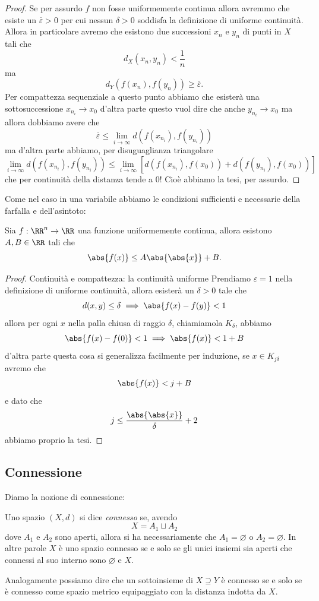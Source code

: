 \documentclass[11pt]{scrartcl}
\newcommand{\eset}{\varnothing}
\begin{document}
	\begin{proof}
		Se per assurdo $f$ non fosse uniformemente continua allora avremmo che esiste un $\overline{\varepsilon}>0$ per cui nessun $\delta>0$ soddisfa la definizione di uniforme continuità. Allora in particolare avremo che esistono due successioni $x_n$ e $y_n$ di punti in $X$ tali che
		$$d_X(x_n,y_n)<\frac{1}{n}$$
		ma
		$$d_Y\left(f(x_n),f(y_n)\right)\ge \overline{\varepsilon}.$$
		Per compattezza sequenziale a questo punto abbiamo che esisterà una sottosuccessione $x_{n_i}\to x_0$ d'altra parte questo vuol dire che anche $y_{n_i}\to x_0$ ma allora
		dobbiamo avere che
		$$\overline{\varepsilon}\le \lim_{i\to\infty}d\left(f(x_{n_i}),f(y_{n_i})\right)$$
		ma d'altra parte abbiamo, per disuguaglianza triangolare
		$$\lim_{i\to\infty}d\left(f(x_{n_i}),f(y_{n_i})\right)\le \lim_{i\to\infty}\left[d\left(f(x_{n_i}),f(x_0)\right)+d\left(f(y_{n_i}),f(x_0)\right)\right]$$
		che per continuità della distanza tende a $0$! Cioè abbiamo la tesi, per assurdo.
	\end{proof}
	Come nel caso in una variabile abbiamo le condizioni sufficienti e necessarie della farfalla e dell'asintoto:
	\begin{theorem}
		Sia $f:\RR^n\to\RR$ una funzione uniformemente continua, allora esistono $A,B\in \RR$ tali che
		$$\abs{f(x)}\le A\abs{\abs{x}}+B.$$
	\end{theorem}
	\begin{proof}Continuità e compattezza: la continuità uniforme
		Prendiamo $\varepsilon=1$ nella definizione di uniforme continuità, allora esisterà un $\delta>0$ tale che
		$$d(x,y)\le \delta \implies \abs{f(x)-f(y)}<1$$
		allora per ogni $x$ nella palla chiusa di raggio $\delta$, chiamiamola $K_\delta$, abbiamo 
		$$\abs{f(x)-f(0)}<1 \implies \abs{f(x)}<1+B$$
		d'altra parte questa cosa si generalizza facilmente per induzione, se $x\in K_{j\delta}$ avremo che
		$$\abs{f(x)}<j+B$$
		e dato che 
		$$j \le \frac{\abs{\abs{x}}}{\delta}+2$$
		abbiamo proprio la tesi.
	\end{proof}
	
	
	\subsection{Connessione}
	
	Diamo la nozione di connessione:
	\begin{definition}[Connessione]
		Uno spazio $(X,d)$ si dice \textit{connesso} se, avendo 
		$$X=A_1\sqcup A_2$$
		dove $A_1$ e $A_2$ sono aperti, allora si ha necessariamente che $A_1=\eset$ o $A_2=\eset$. In altre parole $X$ è uno spazio connesso se e solo se gli unici insiemi sia aperti che connessi al suo interno sono $\eset$ e $X$.
	\end{definition}
	Analogamente possiamo dire che un sottoinsieme di $X\supseteq Y$ è connesso se e solo se è connesso come spazio metrico equipaggiato con la distanza indotta da $X$.
	
\end{document}
